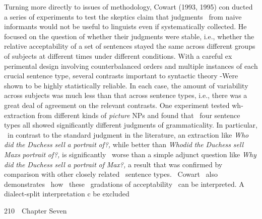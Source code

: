 \begin{styleStandard}
Turning more directly to issues of methodology, Cowart (1993, 1995) con\- ducted a series of experiments to test the skeptics{\textquotesingle} claim that judgments \ from naive informants would not be useful to linguists even if systematically collected. He focused on the question of whether their judgments were stable, i.e., whether the relative acceptability of a set of sentences stayed the same across different groups of subjects at different times under different conditions. With a careful ex\- perimental design involving counterbalanced orders and multiple instances of each crucial sentence type, several contrasts important to syntactic theory {}-Were shown to be highly statistically reliable. In each case, the amount of variability across subjects was much less than that across sentence types, i.e., there was a great deal of agreement on the relevant contrasts. One experiment tested wh-extraction from different kinds of \textit{picture}\textit{ }NPs and found that \ four sentence types all showed significantly different judgments of grammaticality. In particular, \ in contrast to the standard judgment in the literature, an extraction like \textit{Who}\textit{ }\textit{did}\textit{ }\textit{the}\textit{ }\textit{Duchess}\textit{ }\textit{sell}\textit{ }\textit{a}\textit{ }\textit{portrait}\textit{ }\textit{of?,}\textit{ }while better than \textit{Wh}\textit{o}\textit{did}\textit{ }\textit{the}\textit{ }\textit{Duchess}\textit{ }\textit{sell Max{\textquotesingle}s}\textit{ }\textit{portrait}\textit{ }\textit{of?,}\textit{ }is significantly \ worse than a simple adjunct question like \textit{Why}\textit{ }\textit{did}\textit{ }\textit{the}\textit{ }\textit{Duchess}\textit{ }\textit{sell}\textit{ }\textit{a}\textit{ }\textit{portrait}\textit{ }\textit{of}\textit{ }\textit{Max?,}\textit{ }a result that was confirmed by comparison with other closely related \ sentence types. \ Cowart \ also demonstrates \ how \ these \ gradations of acceptability \ can be interpreted. A dialect-split interpretation c be excluded
\end{styleStandard}


\clearpage\setcounter{page}{1}\begin{styleStandard}
210\ \ Chapter Seven
\end{styleStandard}


